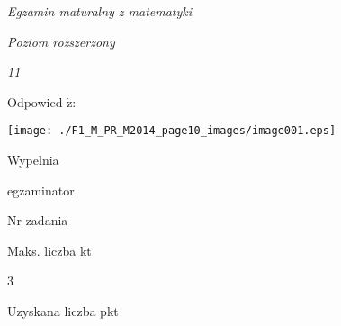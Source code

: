 \documentclass[a4paper,12pt]{article}
\begin{document}
{\it Egzamin maturalny z matematyki}

{\it Poziom rozszerzony}

{\it 11}

Odpowied $\acute{\mathrm{z}}$:
\begin{center}
\texttt{[image: ./F1\_M\_PR\_M2014\_page10\_images/image001.eps]}
\end{center}
Wypelnia

egzaminator

Nr zadania

Maks. liczba kt

3

Uzyskana liczba pkt
\end{document}
